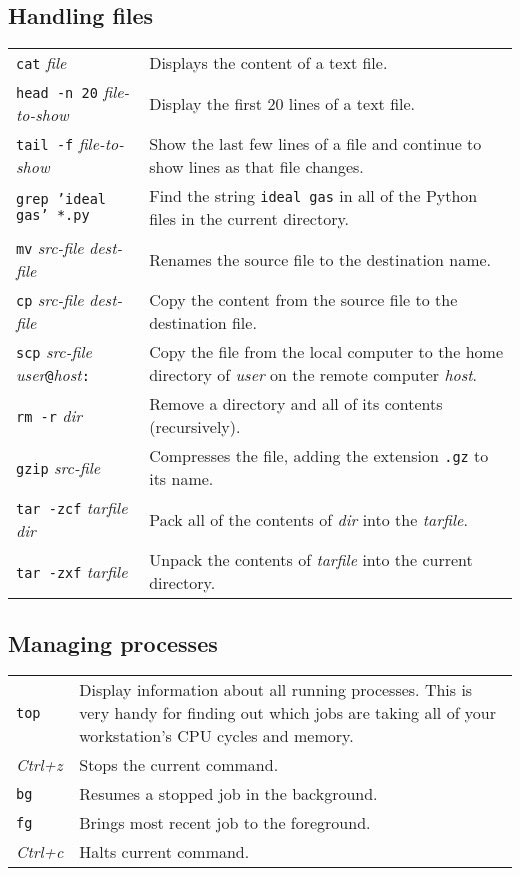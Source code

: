 \subsection*{Handling files}
\begin{tabular}{l|l}
 \texttt{cat} \textit{file} & Displays the content of a text file. \\
 \texttt{head -n 20} \textit{file-to-show} & Display the first 20 lines of a text file. \\
 \texttt{tail -f} \textit{file-to-show} & \parbox{0.6\textwidth}{Show the last few lines of a file and continue 
   to show lines as that file changes.} \\
 \texttt{grep 'ideal gas' *.py} & \parbox{0.6\textwidth}{Find the string \texttt{ideal gas} in all of 
   the Python files in the current directory.} \\
 \texttt{mv} \textit{src-file} \textit{dest-file} & Renames the source file to the destination name. \\
 \texttt{cp} \textit{src-file} \textit{dest-file} & Copy the content from the source file to the destination file. \\
 \texttt{scp} \textit{src-file} \textit{user}\texttt{@}\textit{host}\texttt{:} & \parbox{0.6\textwidth}{Copy the file
   from the local computer to the home directory of \textit{user} on the remote computer \textit{host}.} \\
 \texttt{rm -r} \textit{dir} & Remove a directory and all of its contents (recursively). \\
 \texttt{gzip} \textit{src-file} & Compresses the file, adding the extension \texttt{.gz} to its name. \\
 \texttt{tar -zcf} \textit{tarfile} \textit{dir} & Pack all of the contents of \textit{dir} into the \textit{tarfile}. \\
 \texttt{tar -zxf} \textit{tarfile} & Unpack the contents of \textit{tarfile} into the current directory. \\
\end{tabular}

\subsection*{Managing processes}
\begin{tabular}{l|l}
 \texttt{top} & \parbox{0.9\textwidth}{Display information about all running processes. This is very handy
   for finding out which jobs are taking all of your workstation's CPU cycles and memory.} \\
 \textit{Ctrl+z} & Stops the current command. \\
 \texttt{bg} & Resumes a stopped job in the background. \\
 \texttt{fg} & Brings most recent job to the foreground. \\
 \textit{Ctrl+c} & Halts current command. \\
\end{tabular}

